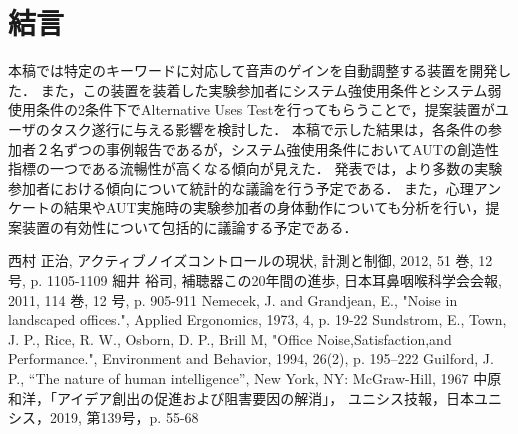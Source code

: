 \documentclass[a4paper]{jarticle}
\begin{document}
\section{結言}
本稿では特定のキーワードに対応して音声のゲインを自動調整する装置を開発した．
また，この装置を装着した実験参加者にシステム強使用条件とシステム弱使用条件の2条件下でAlternative Uses Testを行ってもらうことで，提案装置がユーザのタスク遂行に与える影響を検討した．
本稿で示した結果は，各条件の参加者２名ずつの事例報告であるが，システム強使用条件においてAUTの創造性指標の一つである流暢性が高くなる傾向が見えた．
発表では，より多数の実験参加者における傾向について統計的な議論を行う予定である．
また，心理アンケートの結果やAUT実施時の実験参加者の身体動作についても分析を行い，提案装置の有効性について包括的に議論する予定である．
%
%
\begin{thebibliography}{99}
西村 正治, アクティブノイズコントロールの現状, 計測と制御, 2012, 51 巻, 12 号, p. 1105-1109
細井 裕司, 補聴器この20年間の進歩, 日本耳鼻咽喉科学会会報, 2011, 114 巻, 12 号, p. 905-911
Nemecek, J. and Grandjean, E., "Noise in landscaped offices.", Applied Ergonomics, 1973, 4, p. 19-22
Sundstrom, E., Town, J. P., Rice, R. W., Osborn, D. P., Brill M, "Office Noise,Satisfaction,and Performance.", Environment and Behavior, 1994, 26(2), p. 195–222
Guilford, J. P., “The nature of human intelligence”, New York, NY: McGraw-Hill, 1967
中原和洋，「アイデア創出の促進および阻害要因の解消」，
ユニシス技報，日本ユニシス，2019, 第139号，p. 55-68
\end{thebibliography}
%
%
%
\end{document}

